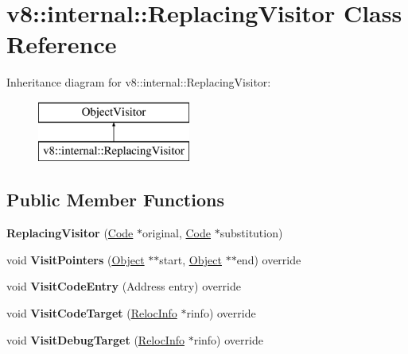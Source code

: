 \hypertarget{classv8_1_1internal_1_1_replacing_visitor}{}\section{v8\+:\+:internal\+:\+:Replacing\+Visitor Class Reference}
\label{classv8_1_1internal_1_1_replacing_visitor}
Inheritance diagram for v8\+:\+:internal\+:\+:Replacing\+Visitor\+:\begin{figure}[H]
\begin{center}
\leavevmode
\includegraphics[height=2.000000cm]{classv8_1_1internal_1_1_replacing_visitor}
\end{center}
\end{figure}
\subsection*{Public Member Functions}
\begin{DoxyCompactItemize}
\item 
{\bfseries Replacing\+Visitor} (\hyperlink{classv8_1_1internal_1_1_code}{Code} $\ast$original, \hyperlink{classv8_1_1internal_1_1_code}{Code} $\ast$substitution)\hypertarget{classv8_1_1internal_1_1_replacing_visitor_aa27b8ea53b02b63a7a40cbf04985c179}{}\label{classv8_1_1internal_1_1_replacing_visitor_aa27b8ea53b02b63a7a40cbf04985c179}

\item 
void {\bfseries Visit\+Pointers} (\hyperlink{classv8_1_1internal_1_1_object}{Object} $\ast$$\ast$start, \hyperlink{classv8_1_1internal_1_1_object}{Object} $\ast$$\ast$end) override\hypertarget{classv8_1_1internal_1_1_replacing_visitor_a234b9225a58c4179ec737c2f3eb8e892}{}\label{classv8_1_1internal_1_1_replacing_visitor_a234b9225a58c4179ec737c2f3eb8e892}

\item 
void {\bfseries Visit\+Code\+Entry} (Address entry) override\hypertarget{classv8_1_1internal_1_1_replacing_visitor_a1e00be2f842b36fa796c54b73dfec553}{}\label{classv8_1_1internal_1_1_replacing_visitor_a1e00be2f842b36fa796c54b73dfec553}

\item 
void {\bfseries Visit\+Code\+Target} (\hyperlink{classv8_1_1internal_1_1_reloc_info}{Reloc\+Info} $\ast$rinfo) override\hypertarget{classv8_1_1internal_1_1_replacing_visitor_accf7d3202b66b09027cc786070ae9f36}{}\label{classv8_1_1internal_1_1_replacing_visitor_accf7d3202b66b09027cc786070ae9f36}

\item 
void {\bfseries Visit\+Debug\+Target} (\hyperlink{classv8_1_1internal_1_1_reloc_info}{Reloc\+Info} $\ast$rinfo) override\hypertarget{classv8_1_1internal_1_1_replacing_visitor_af34a228b41eb02da639c5c2fdeb71dee}{}\label{classv8_1_1internal_1_1_replacing_visitor_af34a228b41eb02da639c5c2fdeb71dee}

\end{DoxyCompactItemize}
